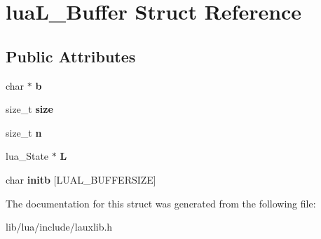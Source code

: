 \hypertarget{structlua_l___buffer}{}\section{lua\+L\+\_\+\+Buffer Struct Reference}
\label{structlua_l___buffer}
\subsection*{Public Attributes}
\begin{DoxyCompactItemize}
\item 
\hypertarget{structlua_l___buffer_ad519a6ef1557666cbdef35e5e8a4ef3b}{}char $\ast$ {\bfseries b}\label{structlua_l___buffer_ad519a6ef1557666cbdef35e5e8a4ef3b}

\item 
\hypertarget{structlua_l___buffer_a2d0288dac89591516c834328beee71cf}{}size\+\_\+t {\bfseries size}\label{structlua_l___buffer_a2d0288dac89591516c834328beee71cf}

\item 
\hypertarget{structlua_l___buffer_a85c23e8716842c83ee8e9d80f1652812}{}size\+\_\+t {\bfseries n}\label{structlua_l___buffer_a85c23e8716842c83ee8e9d80f1652812}

\item 
\hypertarget{structlua_l___buffer_a66ae63716768952c74910da4351886fb}{}lua\+\_\+\+State $\ast$ {\bfseries L}\label{structlua_l___buffer_a66ae63716768952c74910da4351886fb}

\item 
\hypertarget{structlua_l___buffer_a740a9839c94f115d3d5f574a066b9d49}{}char {\bfseries initb} \mbox{[}L\+U\+A\+L\+\_\+\+B\+U\+F\+F\+E\+R\+S\+I\+Z\+E\mbox{]}\label{structlua_l___buffer_a740a9839c94f115d3d5f574a066b9d49}

\end{DoxyCompactItemize}


The documentation for this struct was generated from the following file\+:\begin{DoxyCompactItemize}
\item 
lib/lua/include/lauxlib.\+h\end{DoxyCompactItemize}
